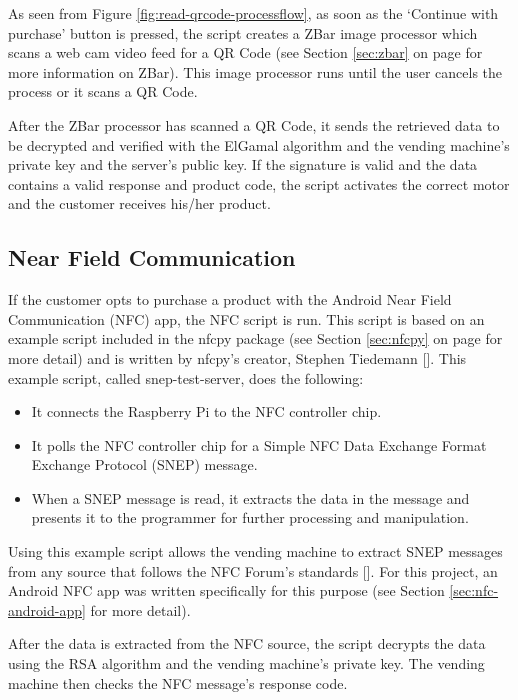 As seen from Figure \ref{fig:read-qrcode-processflow}, as soon as the `Continue
with purchase' button is pressed, the script creates a ZBar image processor
which scans a web cam video feed for a QR Code (see Section \ref{sec:zbar} on page
\pageref{sec:zbar} for more information on ZBar). This image processor runs until the user
cancels the process or it scans a QR Code. 

After the ZBar processor has scanned a QR Code, it sends the retrieved data to
be decrypted and verified with the ElGamal algorithm and the vending machine's
private key and the server's public key. If the signature is valid and the data
contains a valid response and product code, the script activates the correct
motor and the customer receives his/her product. 

\subsection{Near Field Communication}

If the customer opts to purchase a product with the Android Near Field
Communication (NFC) app, the NFC script is run. This script is based on an
example script included in the nfcpy package (see Section \ref{sec:nfcpy} on page
\pageref{sec:nfcpy} for more detail) and is written by nfcpy's creator, Stephen Tiedemann
[\cite{website:nfcpy}]. This example script, called snep-test-server, does the
following:

\begin{itemize}
  \item It connects the Raspberry Pi to the NFC controller chip.
  \item It polls the NFC controller chip for a Simple NFC Data Exchange Format
  Exchange Protocol (SNEP) message.
  \item When a SNEP message is read, it extracts the data in the message and
  presents it to the programmer for further processing and manipulation.
\end{itemize}

Using this example script allows the vending machine to extract SNEP messages
from any source that follows the NFC Forum's standards
[\cite{website:nfc-forum}]. For this project, an Android NFC app was written
specifically for this purpose (see Section \ref{sec:nfc-android-app} for more
detail). 

After the data is extracted from the NFC source, the script decrypts the data
using the RSA algorithm and the vending machine's private key. The vending
machine then checks the NFC message's response code. 

